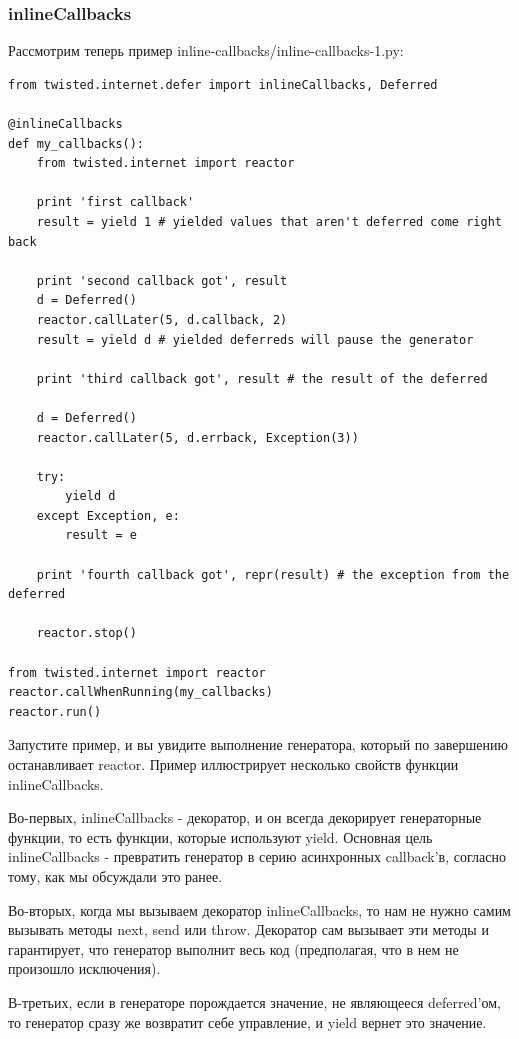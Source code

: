 \subsubsection{inlineCallbacks}

Рассмотрим теперь пример inline-callbacks/inline-callbacks-1.py:

\begin{scriptsize}\begin{verbatim}
from twisted.internet.defer import inlineCallbacks, Deferred

@inlineCallbacks
def my_callbacks():
    from twisted.internet import reactor

    print 'first callback'
    result = yield 1 # yielded values that aren't deferred come right back

    print 'second callback got', result
    d = Deferred()
    reactor.callLater(5, d.callback, 2)
    result = yield d # yielded deferreds will pause the generator

    print 'third callback got', result # the result of the deferred

    d = Deferred()
    reactor.callLater(5, d.errback, Exception(3))

    try:
        yield d
    except Exception, e:
        result = e

    print 'fourth callback got', repr(result) # the exception from the deferred

    reactor.stop()

from twisted.internet import reactor
reactor.callWhenRunning(my_callbacks)
reactor.run()
\end{verbatim}\end{scriptsize}


Запустите пример, и вы увидите выполнение генератора, 
который по завершению останавливает reactor. Пример иллюстрирует 
несколько свойств функции inlineCallbacks.


Во-первых, 
inlineCallbacks - декоратор, и он всегда декорирует 
генераторные функции, то есть функции, которые используют 
yield. Основная цель inlineCallbacks - превратить генератор 
в серию асинхронных callback'в, согласно тому, как мы 
обсуждали это ранее.


Во-вторых, когда мы вызываем декоратор inlineCallbacks, то 
нам не нужно самим вызывать методы next, send или throw. 
Декоратор сам вызывает эти методы и 
гарантирует, что генератор выполнит весь код (предполагая, 
что в нем не произошло исключения). 


В-третьих, если в генераторе порождается значение, не являющееся 
deferred'ом, то генератор сразу же возвратит себе управление, и 
yield вернет это значение. 


